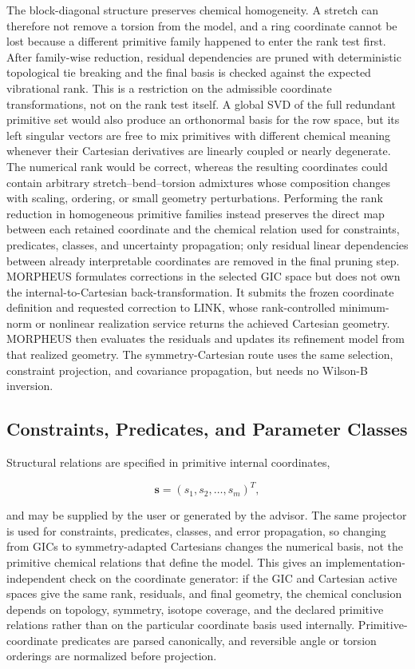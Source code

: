 \documentclass[aip,jcp,reprint,longbibliography,floatfix]{revtex4-2}
\begin{document}
The block-diagonal structure preserves chemical homogeneity. A stretch can
therefore not remove a torsion from the model, and a ring coordinate cannot be
lost because a different primitive family happened to enter the rank test
first. After family-wise reduction, residual dependencies are pruned with
deterministic topological tie breaking and the final basis is checked against
the expected vibrational rank.
This is a restriction on the admissible coordinate transformations, not on the
rank test itself. A global SVD of the full redundant primitive set would also
produce an orthonormal basis for the row space, but its left singular vectors
are free to mix primitives with different chemical meaning whenever their
Cartesian derivatives are linearly coupled or nearly degenerate. The numerical
rank would be correct, whereas the resulting coordinates could contain
arbitrary stretch--bend--torsion admixtures whose composition changes with
scaling, ordering, or small geometry perturbations. Performing the rank
reduction in homogeneous primitive families instead preserves the direct map
between each retained coordinate and the chemical relation used for
constraints, predicates, classes, and uncertainty propagation; only residual
linear dependencies between already interpretable coordinates are removed in
the final pruning step.
MORPHEUS formulates corrections in the selected GIC space but does not own the
internal-to-Cartesian back-transformation. It submits the frozen coordinate
definition and requested correction to LINK, whose rank-controlled
minimum-norm or nonlinear realization service returns the achieved Cartesian
geometry. MORPHEUS then evaluates the residuals and updates its refinement
model from that realized geometry. The symmetry-Cartesian route uses the same
selection, constraint projection, and covariance propagation, but needs no
Wilson-B inversion.


\subsection{Constraints, Predicates, and Parameter Classes}

Structural relations are specified in primitive internal coordinates,

\begin{equation}
\mathbf{s} = (s_1,s_2,\ldots,s_m)^T ,
\end{equation}

and may be supplied by the user or generated by the advisor. The same
projector is used for constraints, predicates, classes, and error propagation,
so changing from GICs to symmetry-adapted Cartesians changes the numerical
basis, not the primitive chemical relations that define the model.
This gives an implementation-independent check on the coordinate generator:
if the GIC and Cartesian active spaces give the same rank, residuals, and final
geometry, the chemical conclusion depends on topology, symmetry, isotope
coverage, and the declared primitive relations rather than on the particular
coordinate basis used internally.
Primitive-coordinate predicates are parsed canonically, and reversible
angle or torsion orderings are normalized before projection.
\end{document}
